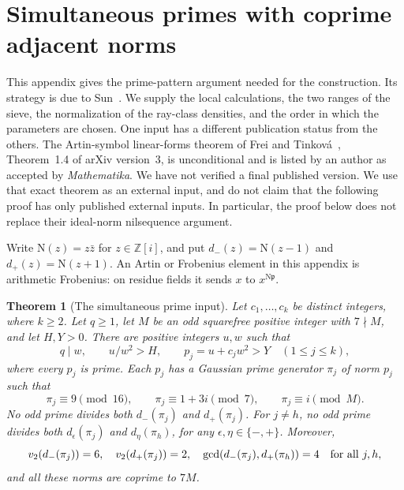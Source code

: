 \documentclass[11pt]{article}
\newtheorem{theorem}{Theorem}[section]
\theoremstyle{definition}
\theoremstyle{remark}
\begin{document}
\section{Simultaneous primes with coprime adjacent norms}
\label{sec:v5-sun-proof}

This appendix gives the prime-pattern argument needed for the construction.
Its strategy is due to Sun~\cite{v5sun}. We supply the local calculations,
the two ranges of the sieve, the normalization of the ray-class densities,
and the order in which the parameters are chosen. One input has a different
publication status from the others. The Artin-symbol linear-forms theorem
of Frei and Tinkov\'a~\cite{v5ft}, Theorem~1.4 of arXiv version~3, is
unconditional and is listed by an author as accepted by \emph{Mathematika}.
We have not verified a final published version. We use that exact theorem
as an external input, and do not claim that the following proof has only
published external inputs. In particular, the proof below does not replace
their ideal-norm nilsequence argument.

Write $\mathrm N(z)=z\bar z$ for $z\in\mathbb Z[i]$, and put
$d_-(z)=\mathrm N(z-1)$ and $d_+(z)=\mathrm N(z+1)$.
An Artin or Frobenius element in this appendix is arithmetic Frobenius:
on residue fields it sends $x$ to $x^{\mathrm N\mathfrak p}$.

\begin{theorem}[The simultaneous prime input]\label{thm:v5-simultaneous-primes}
Let $c_1,\ldots,c_k$ be distinct integers, where $k\geq2$.
Let $q\geq1$, let $M$ be an odd squarefree positive integer with $7\nmid M$,
and let $H,Y>0$. There are positive integers $u,w$ such that
\[
 q\mid w,\qquad u/w^2>H,\qquad p_j=u+c_jw^2>Y
 \quad(1\leq j\leq k),
\]
where every $p_j$ is prime. Each $p_j$ has a Gaussian prime generator
$\pi_j$ of norm $p_j$ such that
\[
 \pi_j\equiv9\pmod {16},\qquad
 \pi_j\equiv1+3i\pmod7,\qquad
 \pi_j\equiv i\pmod M.
\]
No odd prime divides both $d_-(\pi_j)$ and $d_+(\pi_j)$.
For $j\ne h$, no odd prime divides both $d_\epsilon(\pi_j)$ and
$d_\eta(\pi_h)$, for any $\epsilon,\eta\in\{-,+\}$.
Moreover,
\[
 v_2(d_-(\pi_j))=6,\quad v_2(d_+(\pi_j))=2,\quad
 \gcd(d_-(\pi_j),d_+(\pi_h))=4\quad\hbox{for all }j,h,
\]
and all these norms are coprime to $7M$.
\end{theorem}
\end{document}
